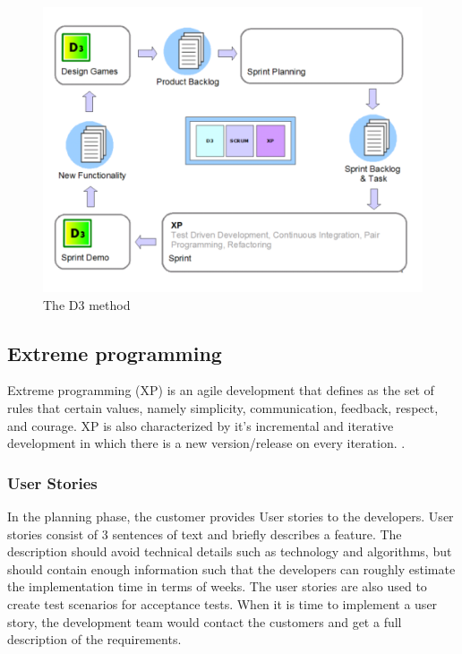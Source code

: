 \begin{figure}[h]
    \includegraphics[width=\textwidth]{images/Agile_D3_small.png}
    \caption{The D3 method}
    \label{fig:d3}
\end{figure}



\subsection{Extreme programming}
Extreme programming (XP) is an agile development that defines as the set of rules that certain values, namely simplicity, communication, feedback, respect, and courage. XP is also characterized by it's incremental and iterative development in which there is a new version/release on every iteration.  \cite{XP_desc}.

\subsubsection{User Stories}
In the planning phase, the customer provides User stories to the developers. User stories consist of 3 sentences of text and briefly describes a feature. The description should avoid technical details such as technology and algorithms, but should contain enough information such that the developers can roughly estimate the implementation time in terms of weeks. The user stories are also used to create test scenarios for acceptance tests. When it is time to implement a user story, the development team would contact the customers and get a full description of the requirements. \cite{XP_UserStories}

